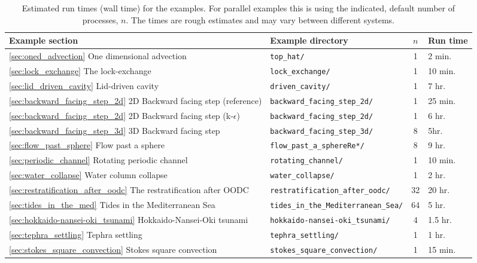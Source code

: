 \begin{table}
\centering
\begin{tabular}{|l|l|c|l|}
  \hline
  Example section & Example directory & $n$ & Run time \\
  \hline
  \ref{sec:oned_advection} One dimensional advection & \texttt{top\_hat/} & 1 & 2 min. \\
  \ref{sec:lock_exchange} The lock-exchange & \texttt{lock\_exchange/} & 1 & 10 min. \\
  \ref{sec:lid_driven_cavity} Lid-driven cavity & \texttt{driven\_cavity/} & 1 & 7 hr. \\
  \ref{sec:backward_facing_step_2d} 2D Backward facing step (reference) & \texttt{backward\_facing\_step\_2d/} & 1 & 25 min. \\
  \ref{sec:backward_facing_step_2d} 2D Backward facing step (k-$\epsilon$) & \texttt{backward\_facing\_step\_2d/} & 1 & 6 hr. \\
  \ref{sec:backward_facing_step_3d} 3D Backward facing step & \texttt{backward\_facing\_step\_3d/} & 8 & 5hr. \\
  \ref{sec:flow_past_sphere} Flow past a sphere & \texttt{flow\_past\_a\_sphereRe*/} & 8 & 9 hr. \\
  \ref{sec:periodic_channel} Rotating periodic channel & \texttt{rotating\_channel/} & 1 & 10 min. \\
  \ref{sec:water_collapse} Water column collapse & \texttt{water\_collapse/} & 1 & 2 hr. \\
  \ref{sec:restratification_after_oodc} The restratification after OODC & \texttt{restratification\_after\_oodc/} & 32 & 20 hr. \\
  \ref{sec:tides_in_the_med} Tides in the Mediterranean Sea  & \texttt{tides\_in\_the\_Mediterranean\_Sea/} & 64 & 5 hr. \\
  \ref{sec:hokkaido-nansei-oki_tsunami} Hokkaido-Nansei-Oki tsunami  & \texttt{hokkaido-nansei-oki\_tsunami/} & 4 & 1.5 hr. \\
  \ref{sec:tephra_settling} Tephra settling & \texttt{tephra\_settling/} & 1 & 1 hr. \\
  \ref{sec:stokes_square_convection} Stokes square convection & \texttt{stokes\_square\_convection/} & 1 & 15 min. \\
  \hline
\end{tabular}
\caption{Estimated run times (wall time) for the examples. For parallel examples this is using
the indicated, default number of processes, $n$. The times are rough estimates and may vary between
different systems.} \label{tab:example_runtimes}
\end{table}

